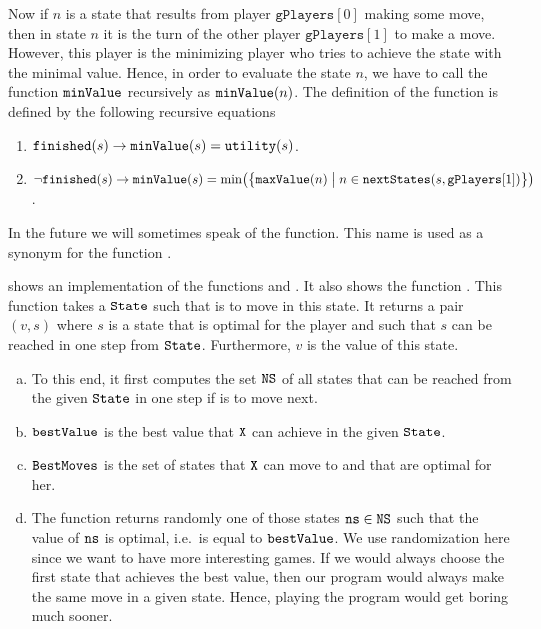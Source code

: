 Now if $n$ is a state that results from player $\texttt{gPlayers}[0]$ making some move, then in state $n$ it is the turn of the other player
$\mathtt{gPlayers}[1]$ to make a move.  However, this player is the minimizing player who tries to achieve the
state with the minimal value.
Hence, in order to evaluate the state $n$, we have to call the function $\texttt{minValue}$
recursively as $\texttt{minValue}(n)$.
The definition of the function  is defined by the following recursive equations
\begin{enumerate}
\item $\texttt{finished}(s) \rightarrow \texttt{minValue}(s) = \texttt{utility}(s)$. 
\item $\neg \texttt{finished}(s) \rightarrow 
       \texttt{minValue}(s) = \min\bigl(\bigl\{
                     \texttt{maxValue}(n) \bigm| n \in \texttt{nextStates}(s, \mathtt{gPlayers}[1])
                     \bigr\}\bigr)
      $.  
\end{enumerate}
In the future we will sometimes speak of the  function.  This name is used as a synonym for the
function . 


 shows an implementation of the functions  and
. It also shows the function . 
This function  takes a $\texttt{State}$ such that  is to move in this state.  It returns a pair
$(v,s)$ where $s$ is a state that is optimal for the player  and such
that $s$ can be reached in one step from $\texttt{State}$.  Furthermore, $v$ is the value of this state.
\begin{enumerate}[(a)]
\item To this end, it first computes the set $\texttt{NS}$ of all states that can be reached 
      from the given $\texttt{State}$ in one step if  is to move next.
\item $\texttt{bestValue}$ is the best value that $\texttt{X}$ can achieve in the given $\texttt{State}$.
\item $\texttt{BestMoves}$ is the set of states that  $\texttt{X}$ can move to and that are optimal
      for her.
\item The function returns randomly one of those states $\texttt{ns} \in \texttt{NS}$ such that 
      the value of $\texttt{ns}$ is optimal, i.e.~is equal to $\texttt{bestValue}$.
      We use randomization here since we want to have more interesting games.  If we would always choose
      the first state that achieves the best value, then our program would always make the same move in
      a given state.  Hence, playing the program would get boring much sooner.
\end{enumerate}


